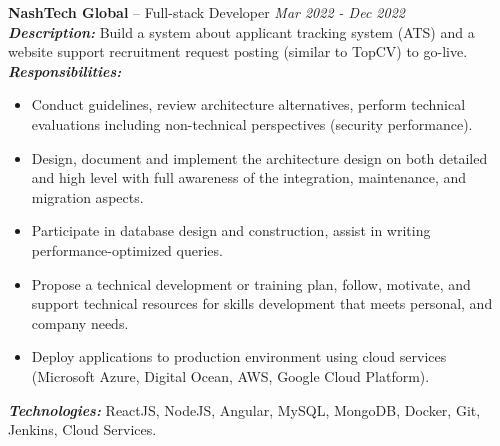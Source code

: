 \documentclass{resume}
\begin{document}
    \hspace{2cm}\textbf{\textbullet{} NashTech Global} – Full-stack Developer \hfill \textit{Mar 2022 - Dec 2022} \\
    \textbf{\textit{Description:}} Build a system about applicant tracking system (ATS) and a website support recruitment request posting (similar to TopCV) to go-live.\\
    \textbf{\textit{Responsibilities:}}
        \begin{itemize}[label={-}, leftmargin=1cm, itemsep=-0.2em]
           \item Conduct guidelines, review architecture alternatives, perform technical evaluations including non-technical perspectives (security performance).
            \item Design, document and implement the architecture design on both detailed and high level with full awareness of the integration, maintenance, and migration aspects.
            \item Participate in database design and construction, assist in writing performance-optimized queries.
            \item Propose a technical development or training plan, follow, motivate, and support technical resources for skills development that meets personal, and company needs.
            \item Deploy applications to production environment using cloud services (Microsoft Azure, Digital Ocean, AWS, Google Cloud Platform).
        \end{itemize}
    \textbf{\textit{Technologies:}} ReactJS, NodeJS, Angular, MySQL, MongoDB, Docker, Git, Jenkins, Cloud Services.\\
\end{document}
